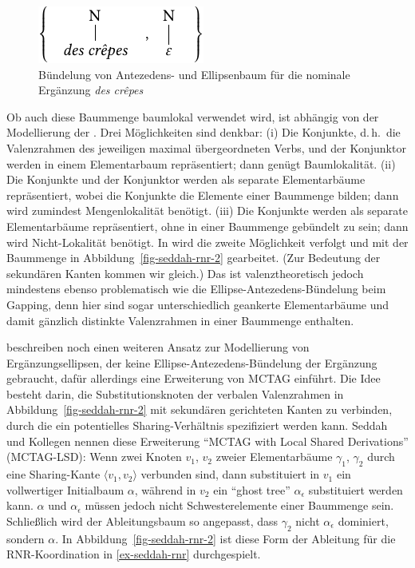 \begin{figure}[t]
\centering
\includegraphics{graphics/abb812.pdf}
\caption{\label{fig-seddah-rnr}Bündelung von Antezedens- und Ellipsenbaum für die nominale Ergänzung {\it des cr\^{e}pes}}
\end{figure}    
Ob auch diese Baummenge baumlokal verwendet wird, ist abhängig von der Modellierung der . Drei Möglichkeiten sind denkbar: (i) Die Konjunkte, d.\,h.\ die Valenzrahmen des jeweiligen maximal übergeordneten Verbs,  und der Konjunktor werden in einem Elementarbaum repräsentiert; dann genügt Baumlokalität. (ii) Die Konjunkte und der Konjunktor werden als separate Elementarbäume repräsentiert, wobei die Konjunkte die Elemente einer Baummenge bilden; dann wird zumindest Mengenlokalität benötigt. (iii) Die Konjunkte werden als separate Elementarbäume repräsentiert, ohne in einer Baummenge gebündelt zu sein; dann wird Nicht-Lokalität benötigt. In \citet[Figure~2]{Seddah:etal:10} wird die zweite Möglichkeit verfolgt und mit der Baummenge in Abbildung~\ref{fig-seddah-rnr-2} gearbeitet. (Zur Bedeutung der sekundären Kanten kommen wir gleich.) Das ist valenztheoretisch jedoch mindestens ebenso problematisch wie die Ellipse-Antezedens-Bündelung beim Gapping, denn hier sind sogar unterschiedlich geankerte Elementarbäume und damit gänzlich distinkte Valenzrahmen in einer Baummenge enthalten.    

\cite{Seddah:etal:10} beschreiben noch einen weiteren Ansatz zur Modellierung von Ergänzungsellipsen, der keine Ellipse-Antezedens-Bündelung der Ergänzung gebraucht, dafür allerdings eine Erweiterung von MCTAG einführt. Die Idee besteht darin, die Substitutionsknoten der verbalen Valenzrahmen in Abbildung~\ref{fig-seddah-rnr-2} mit sekundären gerichteten Kanten zu verbinden, durch die ein potentielles Sharing-Verhältnis spezifiziert werden kann. Seddah und Kollegen nennen diese Erweiterung "`MCTAG with Local Shared Derivations"' (MCTAG-LSD): Wenn zwei Knoten $v_1$, $v_2$  zweier Elementarbäume $\gamma_1$, $\gamma_2$ durch eine Sharing-Kante $\langle v_1,v_2 \rangle$ verbunden sind, dann substituiert in $v_1$ ein vollwertiger Initialbaum $\alpha$, während in $v_2$ ein "`ghost tree"' $\alpha_\epsilon$ substituiert werden kann. $\alpha$ und $\alpha_\epsilon$ müssen jedoch nicht Schwesterelemente einer Baummenge sein. Schlie\ss lich wird der Ableitungsbaum so angepasst, dass $\gamma_2$ nicht $\alpha_\epsilon$ dominiert, sondern $\alpha$. In Abbildung~\ref{fig-seddah-rnr-2} ist diese Form der Ableitung für die RNR-Koordination in \ref{ex-seddah-rnr}  durchgespielt. 

